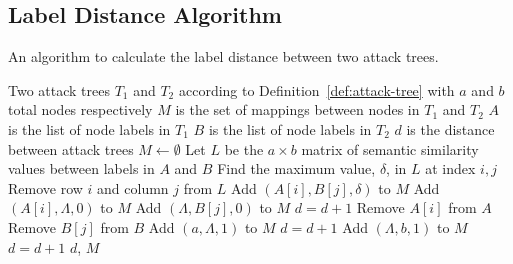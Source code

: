 










\subsection{Label Distance Algorithm}
\label{appendix:alg:label-distance}
\begin{algorithm}[H]
    \caption{An algorithm to calculate the label distance between two attack trees.}
    \label{alg:label-distance}
    \begin{algorithmic}
        \State Two attack trees $T_1$ and $T_2$ according to Definition~\ref{def:attack-tree} with $a$ and $b$ total nodes respectively
        \State $M$ is the set of mappings between nodes in $T_1$ and $T_2$
        \State $A$ is the list of node labels in $T_1$
        \State $B$ is the list of node labels in $T_2$
        \State $d$ is the distance between attack trees
        \State $M \gets \emptyset$
        \State Let $L$ be the $a \times b$ matrix of semantic similarity values between labels in $A$ and $B$
        \State Find the maximum value, $\delta$, in $L$ at index $i, j$
        \State Remove row $i$ and column $j$ from $L$
        \If{$\delta > \epsilon$}
        \State Add $(A[i], B[j], \delta)$ to $M$
        \Else
        \State Add $(A[i], \Lambda, 0)$ to $M$
        \State Add $(\Lambda, B[j], 0)$ to $M$
        \State $d = d + 1$
        \EndIf
        \State Remove $A[i]$ from $A$
        \State Remove $B[j]$ from $B$
        \EndWhile
        \State Add $(a, \Lambda, 1)$ to $M$
        \State $d = d + 1$
        \EndFor
        \State Add $(\Lambda, b, 1)$ to $M$
        \State $d = d + 1$
        \EndFor
        \State \Return $d$, $M$
    \end{algorithmic}
\end{algorithm}

